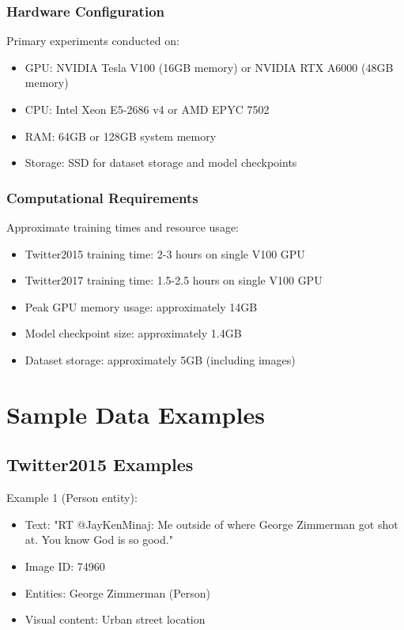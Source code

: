 \documentclass[12pt,a4paper]{report}
\begin{document}
\subsection{Hardware Configuration}

Primary experiments conducted on:
\begin{itemize}
\item GPU: NVIDIA Tesla V100 (16GB memory) or NVIDIA RTX A6000 (48GB memory)
\item CPU: Intel Xeon E5-2686 v4 or AMD EPYC 7502
\item RAM: 64GB or 128GB system memory
\item Storage: SSD for dataset storage and model checkpoints
\end{itemize}

\subsection{Computational Requirements}

Approximate training times and resource usage:
\begin{itemize}
\item Twitter2015 training time: 2-3 hours on single V100 GPU
\item Twitter2017 training time: 1.5-2.5 hours on single V100 GPU
\item Peak GPU memory usage: approximately 14GB
\item Model checkpoint size: approximately 1.4GB
\item Dataset storage: approximately 5GB (including images)
\end{itemize}

\chapter{Sample Data Examples}

\section{Twitter2015 Examples}

Example 1 (Person entity):
\begin{itemize}
\item Text: "RT @JayKenMinaj: Me outside of where George Zimmerman got shot at. You know God is so good."
\item Image ID: 74960
\item Entities: George Zimmerman (Person)
\item Visual content: Urban street location
\end{itemize}
\end{document}
